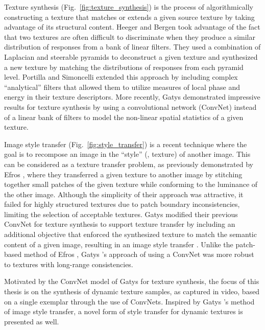 

Texture synthesis (Fig.\ \ref{fig:texture_synthesis}) is the process of algorithmically constructing a texture that
matches or extends a given source texture by taking advantage of its structural 
content. Heeger and Bergen \cite{heeger1995pyramid} took advantage of the fact 
that two textures are often difficult to discriminate when they produce a similar 
distribution of responses from a bank of linear filters. They used a combination 
of Laplacian and steerable pyramids to deconstruct a given texture and 
synthesized a new texture by matching the distributions of responses from each
pyramid level. Portilla and Simoncelli \cite{portilla2000parametric} extended this approach by including complex ``analytical'' filters that allowed them to utilize measures of local phase and energy in their texture descriptors. More recently, Gatys \etal \cite{gatys2015} demonstrated 
impressive results for texture synthesis by using a convolutional network (ConvNet) instead of a linear 
bank of filters to model the non-linear spatial statistics of a given texture.



Image style transfer (Fig.\ \ref{fig:style_transfer}) is a recent technique where the goal is to 
recompose an image in the ``style'' (\eg, texture) of another image. This can be considered as a 
texture transfer problem, as previously demonstrated by Efros \etal \cite{efros2001image}, where they transferred a given texture to another image by stitching together small patches of the given texture while conforming to the luminance of the other image. Although the simplicity of their approach was attractive, it failed for highly structured textures due to patch boundary inconsistencies, limiting the selection of acceptable textures. 
Gatys \etal \cite{gatys2015} modified their previous ConvNet for texture synthesis to support texture transfer by including an additional objective that enforced the synthesized texture to match the semantic content of a given image, resulting in an image style transfer \cite{gatys2016image}. Unlike the patch-based method of Efros \etal \cite{efros2001image}, Gatys \etal's approach of using a ConvNet was more robust to textures with long-range consistencies.

Motivated by the ConvNet model of Gatys \etal \cite{gatys2015} for texture synthesis, the focus of this thesis is on the synthesis of dynamic texture 
samples, as captured in video, based on a single exemplar through the use of ConvNets. Inspired by Gatys \etal's \cite{gatys2016image} method of image style transfer, a novel form of style transfer for dynamic textures is presented as well.

